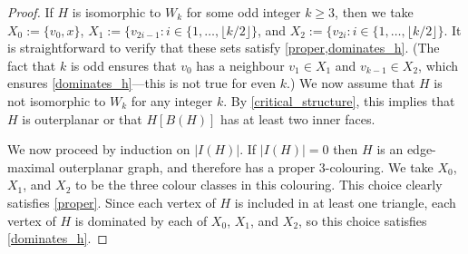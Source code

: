 \documentclass[11pt]{article}
\theoremstyle{definition}
\begin{document}
\begin{proof}
  If $H$ is isomorphic to $W_k$ for some odd integer $k\ge 3$, then we take $X_0:=\{v_0, x\}$, $X_1:=\{v_{2i-1}:i\in\{1,\ldots,\lfloor k/2\rfloor\}$, and $X_2:=\{v_{2i}:i\in\{1,\ldots,\lfloor k/2\rfloor\}$.  It is straightforward to verify that these sets satisfy \cref{proper,dominates_h}.  (The fact that $k$ is odd ensures that $v_0$ has a neighbour $v_1\in X_1$ and $v_{k-1}\in X_2$, which ensures \cref{dominates_h}---this is not true for even $k$.)   We now assume that $H$ is not isomorphic to $W_k$ for any integer $k$.  By \cref{critical_structure}, this implies that $H$ is outerplanar or that $H[B(H)]$ has at least two inner faces.

  We now proceed by induction on $|I(H)|$.  If $|I(H)|=0$ then $H$ is an edge-maximal outerplanar graph, and therefore has a proper $3$-colouring.  We take $X_0$, $X_1$, and $X_2$ to be the three colour classes in this colouring.  This choice clearly satisfies \cref{proper}. Since each vertex of $H$ is included in at least one triangle, each vertex of $H$ is dominated by each of $X_0$, $X_1$, and $X_2$, so this choice satisfies \cref{dominates_h}.


\end{proof}
\end{document}

